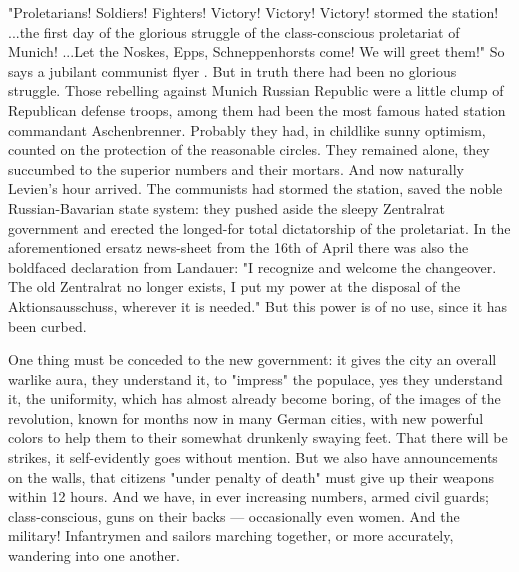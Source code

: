 "Proletarians! Soldiers! Fighters! Victory! Victory! Victory! stormed the station! ...the first day of the glorious struggle of the class-conscious proletariat of Munich! ...Let the Noskes, Epps, Schneppenhorsts come! We will greet them!" So says a jubilant communist flyer . But in truth there had been no glorious struggle. Those rebelling against Munich Russian Republic were a little clump of Republican defense troops, among them had been the most famous hated station commandant Aschenbrenner. Probably they had, in childlike sunny optimism, counted on the protection of the reasonable circles. They remained alone, they succumbed to the superior numbers and their mortars. And now naturally Levien's hour arrived. The communists had stormed the station, saved the noble Russian-Bavarian state system: they pushed aside the sleepy Zentralrat government and erected the longed-for total dictatorship of the proletariat. In the aforementioned ersatz news-sheet from the 16th of April there was also the boldfaced declaration from Landauer: "I recognize and welcome the changeover. The old Zentralrat no longer exists, I put my power at the disposal of the Aktionsausschuss, wherever it is needed." But this power is of no use, since it has been curbed.

One thing must be conceded to the new government: it gives the city an overall warlike aura, they understand it, to "impress" the populace, yes they understand it, the uniformity, which has almost already become boring, of the images of the revolution, known for months now in many German cities, with new powerful colors to help them to their somewhat drunkenly swaying feet. That there will be strikes, it self-evidently goes without mention. But we also have announcements on the walls, that citizens "under penalty of death" must give up their weapons within 12 hours. And we have, in ever increasing numbers, armed civil guards; class-conscious, guns on their backs — occasionally even women. And the military! Infantrymen and sailors marching together, or more accurately, wandering into one another. 



